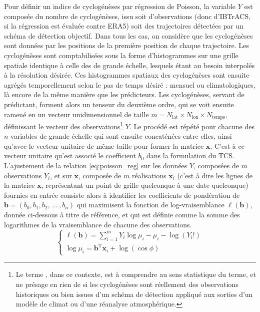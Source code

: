 \documentclass[../main.tex]{subfiles}
\begin{document}
Pour définir un indice de cyclogénèses par régression de Poisson, la variable $Y$ est composée du nombre de cyclogénèses, issu soit d'observations (donc
d'IBTrACS, si la régression est évaluée contre ERA5) soit des trajectoires détectées par un schéma de détection objectif. Dans tous les cas, on considère que
les cyclogénèses sont données par les positions de la première position de chaque trajectoire. Les cyclogénèses sont comptabilisées sous la forme d'histogrammes
sur une grille spatiale identique à celle des de grande échelle, lesquels étant au besoin interpolés à la résolution désirée. Ces histogrammes spatiaux des
cyclogénèses sont ensuite agrégés temporellement selon le pas de temps désiré : mensuel ou climatologiques, là encore de la même manière que les prédicteurs.
Les cyclogénèses, servant de prédictant, forment alors un tenseur du deuxième ordre, qui se voit ensuite ramené en un vecteur unidimensionnel de taille $m =
N_{\mathrm{lat}} \times N_{\mathrm{lon}} \times N_{\mathrm{temps}}$, définissant le vecteur des observations\footnote{Le terme , dans ce
contexte, est à comprendre au sens statistique du terme, et ne présage en rien de si les cyclogénèses sont réellement des observations historiques ou bien
issues d'un schéma de détection appliqué aux sorties d'un modèle de climat ou d'une réanalyse atmosphérique.} $Y$. Le procédé est répété pour chacune des $n$
variables de grande échelle qui sont ensuite concaténées entre elles, ainsi qu'avec le vecteur unitaire de même taille pour former la matrice $\mathbf{x}$.
C'est à ce vecteur unitaire qu'est associé le coefficient $b_0$ dans la formulation du TCS. L'ajustement de la relation \ref{eq:poisson_reg} sur les données
$Y$, composées de $m$ observations $Y_i$, et sur $\mathbf{x}$, composée de $m$ réalisations $\mathbf{x}_i$ (c'est à dire les lignes de la matrice $\mathbf{x}$,
représentant un point de grille quelconque à une date quelconque) fournies en entrée consiste alors à identifier les coefficients de pondération de $\mathbf{b}
= (b_0, b_1, b_2, \, \ldots \, , b_n)$ qui maximisent la fonction de log-vraisemblance $\ell (\mathbf{b})$, donnée ci-dessous à titre de référence, et qui est
définie comme la somme des logarithmes de la vraisemblance de chacune des observations.
%
\begin{equation*}
    \begin{cases}
        \ell(\mathbf{b}) = \sum_{i = 1}^{m} Y_i \log \mu_i - \mu_i - \log(Y_i !) \\
        \log \mu_i = \mathbf{b}^{\mathrm{T}} \mathbf{x}_i + \log ( \cos \phi )
    \end{cases}
\end{equation*}
\end{document}
